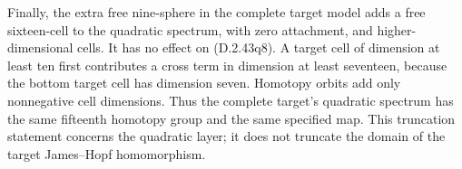 Finally, the extra free nine-sphere in the complete target model
adds a free sixteen-cell to the quadratic spectrum, with zero
attachment, and higher-dimensional cells.  It has no effect on
\textup{(D.2.43q8)}.  A target cell of dimension at least ten
first contributes a cross term in dimension at least seventeen,
because the bottom target cell has dimension seven.  Homotopy
orbits add only nonnegative cell dimensions.  Thus the complete
target's quadratic spectrum has the same fifteenth homotopy
group and the same specified map.  This truncation statement
concerns the quadratic layer; it does not truncate the domain
of the target James--Hopf homomorphism.
